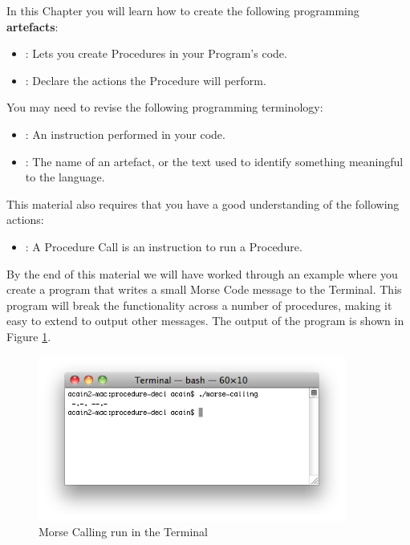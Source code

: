 In this Chapter you will learn how to create the following programming \textbf{artefacts}:

\begin{itemize}
  \item {}: Lets you create Procedures in your Program's code.
  \item {}: Declare the actions the Procedure will perform.
\end{itemize}

\bigskip

You may need to revise the following programming terminology:
\begin{itemize}
  \item {}: An instruction performed in your code.
  \item {}: The name of an artefact, or the text used to identify something meaningful to the language.
\end{itemize}

This material also requires that you have a good understanding of the following actions:
\begin{itemize}
  \item {}: A Procedure Call is an instruction to run a Procedure.
\end{itemize}

By the end of this material we will have worked through an example where you create a program that writes a small Morse Code message to the Terminal. This program will break the functionality across a number of procedures, making it easy to extend to output other messages. The output of the program is shown in Figure \ref{fig:procedure-decl-morse_calling}.

\begin{figure}[h]
   \centering
   \includegraphics[width=0.9\textwidth]{./topics/procedure-decl/images/MorseCalling} 
   \caption{Morse Calling run in the Terminal}
   \label{fig:procedure-decl-morse_calling}
\end{figure}


